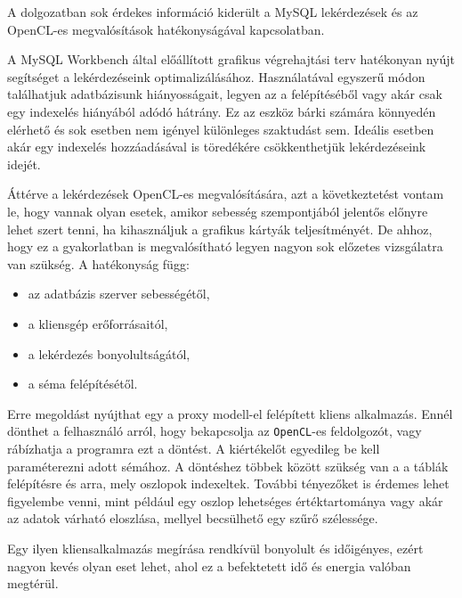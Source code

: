 
A dolgozatban sok érdekes információ kiderült a MySQL lekérdezések és az OpenCL-es megvalósítások hatékonyságával kapcsolatban.

A MySQL Workbench által előállított grafikus végrehajtási terv hatékonyan nyújt segítséget a lekérdezéseink optimalizálásához. Használatával egyszerű módon találhatjuk adatbázisunk hiányosságait, legyen az a felépítéséből vagy akár csak egy indexelés hiányából adódó hátrány. Ez az eszköz bárki számára könnyedén elérhető és sok esetben nem igényel különleges szaktudást sem. Ideális esetben akár egy indexelés hozzáadásával is töredékére csökkenthetjük lekérdezéseink idejét.

Áttérve a lekérdezések OpenCL-es megvalósítására, azt a következtetést vontam le, hogy vannak olyan esetek, amikor sebesség szempontjából jelentős előnyre lehet szert tenni, ha kihasználjuk a grafikus kártyák teljesítményét. De ahhoz, hogy ez a gyakorlatban is megvalósítható legyen nagyon sok előzetes vizsgálatra van szükség. A hatékonyság függ:
\begin{itemize}
\item az adatbázis szerver sebességétől,
\item a kliensgép erőforrásaitól,
\item a lekérdezés bonyolultságától,
\item a séma felépítésétől.
\end{itemize}

Erre megoldást nyújthat egy a proxy modell-el felépített kliens alkalmazás. Ennél dönthet a felhasználó arról, hogy bekapcsolja az \texttt{OpenCL}-es feldolgozót, vagy rábízhatja a programra ezt a döntést. A kiértékelőt egyedileg be kell paraméterezni adott sémához. A döntéshez többek között szükség van a a táblák felépítésre és arra, mely oszlopok indexeltek. További tényezőket is érdemes lehet figyelembe venni, mint például egy oszlop lehetséges értéktartománya vagy akár az adatok várható eloszlása, mellyel becsülhető egy szűrő szélessége. 

Egy ilyen kliensalkalmazás megírása rendkívül bonyolult és időigényes, ezért nagyon kevés olyan eset lehet, ahol ez a befektetett idő és energia valóban megtérül. 
